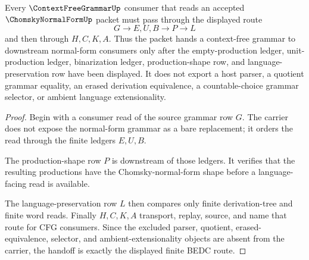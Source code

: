 \begin{theorem}
\label{thm:chomsky-normal-form-cfg-handoff}
Every $\ContextFreeGrammarUp$ consumer that reads an accepted $\ChomskyNormalFormUp$ packet must pass through the displayed route
$$
G \longrightarrow E,U,B \longrightarrow P \longrightarrow L
$$
and then through $H,C,K,A$. Thus the packet hands a context-free grammar to downstream normal-form consumers only after the empty-production ledger, unit-production ledger, binarization ledger, production-shape row, and language-preservation row have been displayed. It does not export a host parser, a quotient grammar equality, an erased derivation equivalence, a countable-choice grammar selector, or ambient language extensionality.
\end{theorem}
\begin{proof}
Begin with a consumer read of the source grammar row $G$. The carrier does not expose the normal-form grammar as a bare replacement; it orders the read through the finite ledgers $E,U,B$.

The production-shape row $P$ is downstream of those ledgers. It verifies that the resulting productions have the Chomsky-normal-form shape before a language-facing read is available.

The language-preservation row $L$ then compares only finite derivation-tree and finite word reads. Finally $H,C,K,A$ transport, replay, source, and name that route for CFG consumers. Since the excluded parser, quotient, erased-equivalence, selector, and ambient-extensionality objects are absent from the carrier, the handoff is exactly the displayed finite BEDC route.
\end{proof}


\begin{closurestatus}{\ChomskyNormalFormUp}
  \theoryclosure{\seedClosure}
  \formalstatus{\unformalizedV}
\end{closurestatus}

